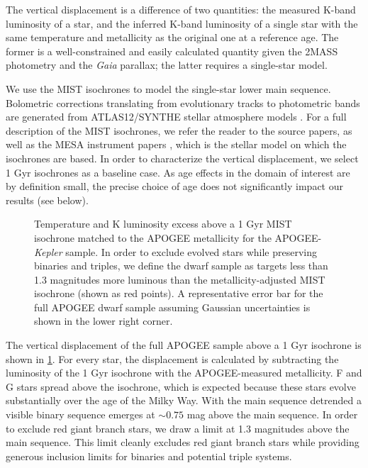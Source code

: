 \documentclass[manuscript]{aastex6}
\newcommand{\Kepler}{\mbox{\textit{Kepler}}}
\newcommand{\Gaia}{\mbox{\textit{Gaia}}}
\begin{document}
The vertical displacement is a difference of two quantities: the measured 
K-band luminosity of a star, and the inferred K-band luminosity of a single 
star with the same temperature and metallicity as the original one at a reference age. The 
former is a well-constrained and easily calculated quantity given the 2MASS 
photometry and the \Gaia{} parallax; the latter requires a single-star model.

We use the MIST \citep{Dotter16,Choi16} isochrones to model the 
single-star lower main sequence. Bolometric corrections translating from
evolutionary tracks to photometric bands are generated from ATLAS12/SYNTHE
stellar atmosphere models \citep{Kurucz70,Kurucz93}. For a full description of the MIST isochrones, we 
refer the reader to the source papers, as well as the MESA instrument papers 
\citep{Paxton11, Paxton13, Paxton15}, which is the stellar model on which the 
isochrones are based. In order to characterize the vertical displacement, we select 1 Gyr isochrones
as a baseline case. As age effects in the domain of interest are by definition
small, the precise choice of age does not significantly impact our results (see
below).

\begin{figure}[htb]
    \centering
    \caption{Temperature and K luminosity excess above a 1 Gyr MIST isochrone 
        matched to the APOGEE metallicity for the APOGEE-\Kepler{} sample. 
        In order to exclude evolved stars while preserving binaries and
        triples, we define the dwarf sample as targets less than 1.3 magnitudes
        more luminous than the metallicity-adjusted MIST isochrone (shown as
        red points). A representative error bar for the 
        full APOGEE dwarf sample assuming Gaussian uncertainties is shown in 
        the lower right corner.}\label{fig:sample_dk}
\end{figure}


The vertical displacement of the full APOGEE sample above a 1 Gyr isochrone is 
shown in \cref{fig:sample_dk}. For every star, the displacement is calculated 
by subtracting the luminosity of the 1 Gyr isochrone with the APOGEE-measured 
metallicity. F and G stars spread above the isochrone, which is 
expected because these stars evolve substantially over the age of the Milky
Way. With the main sequence detrended a visible binary sequence emerges at 
\(\sim0.75\) mag above the main sequence. In order to exclude red 
giant branch stars, we draw a limit at 1.3 magnitudes above the main sequence. 
This limit cleanly excludes red giant branch stars while providing generous 
inclusion limits for binaries and potential triple systems.
\end{document}

